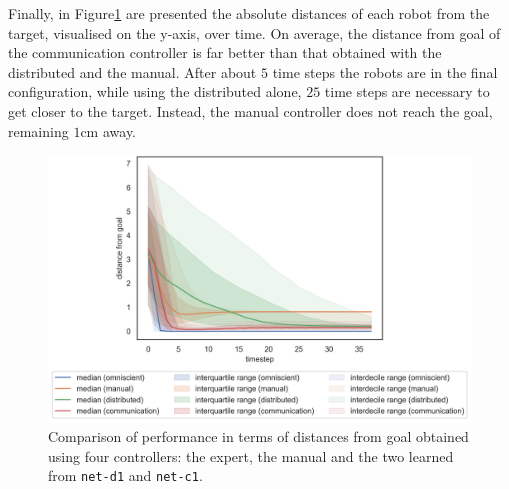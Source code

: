 Finally, in Figure\ref{fig:net-c1distance} are presented the absolute distances of 
each robot from the target, visualised on the y-axis, over time.
On average, the distance from goal of the communication controller is far better  
than that obtained with the distributed and the manual. After about $5$ time 
steps the robots are in the final configuration, while using the distributed 
alone, $25$ time steps are necessary to get closer to the target. Instead, the 
manual controller does not reach the goal, remaining $1$\gls{cm} away. 
\begin{figure}[H]
	\centering
	\includegraphics[width=.65\textwidth]{contents/images/net-c1/distances-from-goal-compressed-communication}%
	\caption[Evaluation of \texttt{net-c1} distances from goal.]{Comparison of 
		performance in terms of distances from goal obtained using four controllers: 
		the expert, the manual and the two learned from \texttt{net-d1} and 
		\texttt{net-c1}.}
	\label{fig:net-c1distance}
\end{figure}


